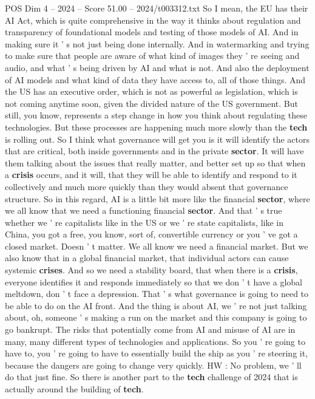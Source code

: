 \begin{textsample}{POS Dim 4 – 2024 – Score 51.00 – 2024/t003312.txt}
So I mean, the EU has their AI Act, which is quite comprehensive in the way it thinks about regulation and transparency of foundational models and testing of those models of AI.
And in making sure it ' s not just being done internally.
And in watermarking and trying to make sure that people are aware of what kind of images they ' re seeing and audio, and what ' s being driven by AI and what is not.
And also the deployment of AI models and what kind of data they have access to, all of those things.
And the US has an executive order, which is not as powerful as legislation, which is not coming anytime soon, given the divided nature of the US government.
But still, you know, represents a step change in how you think about regulating these technologies.
But these processes are happening much more slowly than the \textbf{tech} is rolling out.
So I think what governance will get you is it will identify the actors that are critical, both inside governments and in the private \textbf{sector}.
It will have them talking about the issues that really matter, and better set up so that when a \textbf{crisis} occurs, and it will, that they will be able to identify and respond to it collectively and much more quickly than they would absent that governance structure.
So in this regard, AI is a little bit more like the financial \textbf{sector}, where we all know that we need a functioning financial \textbf{sector}.
And that ' s true whether we ' re capitalists like in the US or we ' re state capitalists, like in China, you got a free, you know, sort of, convertible currency or you ' ve got a closed market.
Doesn ' t matter.
We all know we need a financial market.
But we also know that in a global financial market, that individual actors can cause systemic \textbf{crises}.
And so we need a stability board, that when there is a \textbf{crisis}, everyone identifies it and responds immediately so that we don ' t have a global meltdown, don ' t face a depression.
That ' s what governance is going to need to be able to do on the AI front.
And the thing is about AI, we ' re not just talking about, oh, someone ' s making a run on the market and this company is going to go bankrupt.
The risks that potentially come from AI and misuse of AI are in many, many different types of technologies and applications.
So you ' re going to have to, you ' re going to have to essentially build the ship as you ' re steering it, because the dangers are going to change very quickly.
HW : No problem, we ' ll do that just fine.
So there is another part to the \textbf{tech} challenge of 2024 that is actually around the building of \textbf{tech}.

\end{textsample}
